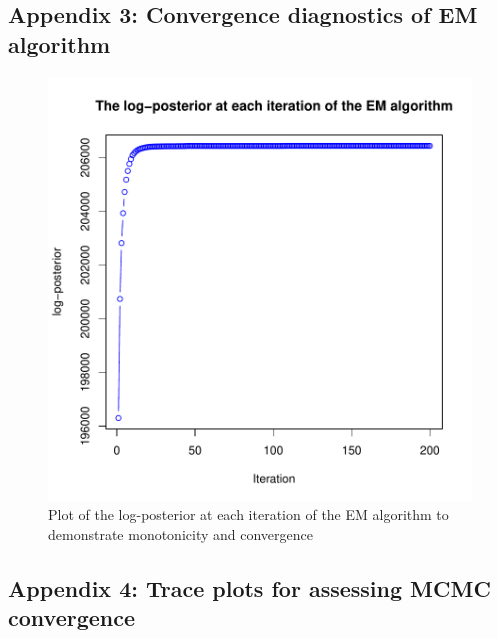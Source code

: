 \documentclass[12pt,english]{article}
\begin{document}
\subsection{Appendix 3: Convergence diagnostics of EM algorithm} \label{app:logposterior}
\begin{figure}[h]
  \centering
\includegraphics{tagm-030}

\caption{Plot of the log-posterior at each iteration of the EM algorithm to demonstrate monotonicity and convergence}
  \label{figure::emconvergence}
\end{figure}

\clearpage
\subsection{Appendix 4: Trace plots for assessing MCMC convergence}\label{app:mcmc}
\end{document}

